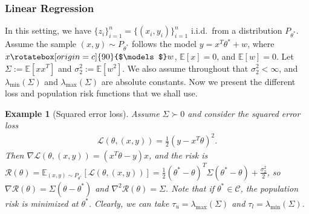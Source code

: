 \documentclass{article}
\newtheorem{example}{Example}
\newcommand{\indep}{\rotatebox[origin=c]{90}{$\models$}}
\newcommand{\iid}{i.i.d.{\ }}
\begin{document}

\subsubsection{Linear Regression}
\label{sec:Linear Regression}

In this setting, we have $\{z_i\}_{i = 1}^n = \{(x_i, y_i)\}_{i = 1}^n$ \iid from a distribution $P_{\theta^*}$. Assume the sample $(x, y) \sim P_{\theta^*}$ follows the model $y = x^T\theta^* + w$, where $x \indep w$, $\mathbb{E}[x] = 0$, and $\mathbb{E}[w] = 0$. Let $\Sigma := \mathbb{E}[xx^T]$ and $\sigma_2^2 := \mathbb{E}[w^2]$. We also assume throughout that $\sigma_2^2 < \infty$, and $\lambda_{\min}(\Sigma)$ and $\lambda_{\max}(\Sigma)$ are absolute constants. Now we present the different loss and population risk functions that we shall use.

\begin{example} [Squared error loss]
\label{sec:LR_Squared_Loss}
Assume $\Sigma \succ 0$ and consider the squared error loss
\begin{align*}
\mathcal{L}(\theta, (x, y)) = \frac{1}{2}(y - x^T\theta)^2.
\end{align*}
Then $\nabla \mathcal{L}(\theta, (x, y)) = (x^T\theta - y)x$, and the risk is $\mathcal{R}(\theta) = \mathbb{E}_{(x, y) \sim P_{\theta^*}}[\mathcal{L}(\theta, (x, y))] = \frac{1}{2}(\theta^* - \theta)^T\Sigma(\theta^* - \theta) + \frac{\sigma_2^2}{2}$, so $\nabla \mathcal{R}(\theta) = \Sigma(\theta - \theta^*)$ and $\nabla^2 \mathcal{R}(\theta) = \Sigma$.
Note that if $\theta^* \in \mathcal{C}$, the population risk is minimized at $\theta^*$.
Clearly, we can take
$\tau_u = \lambda_{\max}(\Sigma)$ and $\tau_l = \lambda_{\min}(\Sigma)$.
\end{example}

\end{document}
